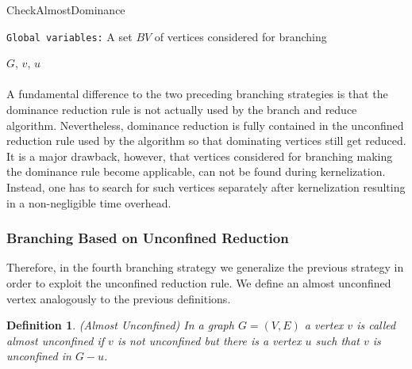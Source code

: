 \documentclass[12pt,a4paper,twoside]{scrartcl}
\newtheorem{definition}{Definition}
\numberwithin{equation}{section}
\let\oldnl\nl%
\newcommand{\nonl}{\renewcommand{\nl}{\let\nl\oldnl}}%
\begin{document}
\begin{algorithm}
	\caption{CheckAlmostDominance}\label{alg:alm_dominance}
	\DontPrintSemicolon
	\nonl\texttt{Global variables:} A set $BV$ of vertices considered for branching\\
	
	\U{$G$, $v$, $u$}	
	
	
\end{algorithm}

\paragraph{}
A fundamental difference to the two preceding branching strategies is that the dominance reduction rule is not actually used by the branch and reduce algorithm. Nevertheless, dominance reduction is fully contained in the unconfined reduction rule used by the algorithm so that dominating vertices still get reduced. It is a major drawback, however, that vertices considered for branching making the dominance rule become applicable, can not be found during kernelization. Instead, one has to search for such vertices separately after kernelization resulting in a non-negligible time overhead. 

\subsubsection{Branching Based on Unconfined Reduction}
Therefore, in the fourth branching strategy we generalize the previous strategy in order to exploit the unconfined reduction rule. We define an almost unconfined vertex analogously to the previous definitions.

\begin{definition} (Almost Unconfined)
	In a graph $G=(V,E)$ a vertex $v$ is called almost unconfined if $v$ is not unconfined but there is a vertex $u$ such that $v$ is unconfined in $G-u$.
\end{definition}
\end{document}
